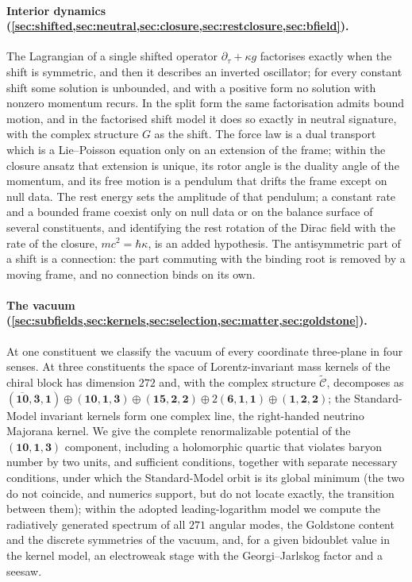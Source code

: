 \paragraph{Interior dynamics (\cref{sec:shifted,sec:neutral,sec:closure,sec:restclosure,sec:bfield}).} The Lagrangian of a single shifted operator
$\partial_\tau+\kappa g$ factorises exactly when the shift is symmetric, and then it describes an inverted oscillator; for
every constant shift some solution is unbounded, and with a positive form no solution with nonzero momentum recurs. In the
split form the same factorisation admits bound motion, and in the factorised shift model it does so exactly in neutral signature, with the
complex structure $G$ as the shift. The force law is a dual transport which is a Lie--Poisson equation only on an extension of the
frame; within the closure ansatz that extension is unique, its rotor angle is the duality angle of the momentum, and its free motion is a pendulum
that drifts the frame except on null data. The rest energy sets the amplitude of that pendulum; a constant rate and a bounded frame
coexist only on null data or on the balance surface of several constituents, and identifying the rest rotation of the Dirac field
with the rate of the closure, $mc^2=\hbar\kappa$, is an added hypothesis. The antisymmetric part of a shift is a connection: the part
commuting with the binding root is removed by a moving frame, and no connection binds on its own.

\paragraph{The vacuum (\cref{sec:subfields,sec:kernels,sec:selection,sec:matter,sec:goldstone}).} At one constituent we
classify the vacuum of every coordinate three-plane in four senses. At three constituents the space of Lorentz-invariant
mass kernels of the chiral block has dimension $272$ and, with the complex structure $\widetilde{\mathcal C}$, decomposes as
$(\overline{\mathbf{10}},\mathbf3,\mathbf1)\oplus(\mathbf{10},\mathbf1,\mathbf3)\oplus(\mathbf{15},\mathbf2,\mathbf2)\oplus
2(\mathbf6,\mathbf1,\mathbf1)\oplus(\mathbf1,\mathbf2,\mathbf2)$; the Standard-Model invariant kernels form one complex
line, the right-handed neutrino Majorana kernel. We give the complete renormalizable potential of the
$(\mathbf{10},\mathbf1,\mathbf3)$ component, including a holomorphic quartic that violates baryon number by two units,
and sufficient conditions, together with separate necessary conditions, under which the Standard-Model orbit is its global minimum (the two
do not coincide, and numerics support, but do not locate exactly, the transition between them); within the adopted leading-logarithm
model we compute the radiatively generated spectrum of all $271$ angular modes, the Goldstone content and the discrete symmetries of the
vacuum, and, for a given bidoublet value in the kernel model, an electroweak stage with the Georgi--Jarlskog factor and a seesaw.

